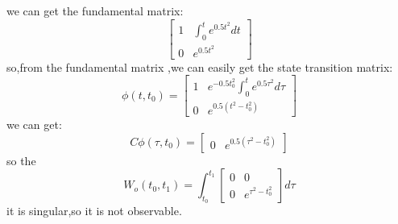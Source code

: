 \documentclass{article}
\begin{document}
we can get the fundamental matrix:
\[
\left[
    \begin{array}{cc}
        1 & \int_0^t e^{0.5t^2}dt\\
        0 & e^{0.5t^2}
    \end{array}
\right]    
\]
so,from the fundamental matrix ,we can easily get the state transition matrix:
\[
\phi(t,t_0)=
\left[
    \begin{array}{cc}
        1 & e^{-0.5t_0^2}\int_0^t e^{0.5\tau^2}d \tau\\
        0 & e^{0.5(t^2-t_0^2)}
    \end{array}
\right]  
\]  
we can get:\\
\[
C\phi(\tau,t_0)=
\left[
    \begin{array}{cc}
    0 & e^{0.5(\tau^2-t_0^2)}
    \end{array}
\right]   
\]
so the 
\[W_o(t_0,t_1)=
\int_{t_0}^{t_1}
\left[
    \begin{array}{cc}
        0 & 0\\
        0 & e^{\tau^2-t_0^2}
    \end{array}
\right]d\tau
\]
it is singular,so it is not observable.
\end{document}
